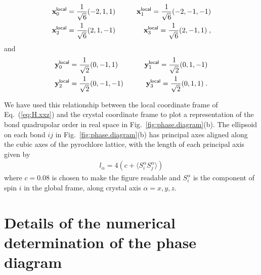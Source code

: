 \documentclass[apsrev4-1,prx,superscriptaddress,floatfix,twocolumn,longbibliography]{revtex4-1}
\begin{document}
\begin{appendix}
\begin{eqnarray}
&\mathbf{x}^{\sf local}_0 = \dfrac{1}{\sqrt{6}}(-2,1,1)
\qquad
&\mathbf{x}^{\sf local}_1 = \dfrac{1}{\sqrt{6}}(-2,-1,-1)
\nonumber \\
&\mathbf{x}^{\sf local}_2 = \dfrac{1}{\sqrt{6}}(2,1,-1)
\qquad
&\mathbf{x}^{\sf local}_3 = \dfrac{1}{\sqrt{6}}(2,-1,1)
\; , \nonumber
\label{eq:local-easy-plane-x}\\
\end{eqnarray}
%
and
\begin{eqnarray}
&\mathbf{y}^{\sf local}_0 = \dfrac{1}{\sqrt{2}}(0,-1,1)
\qquad
&\mathbf{y}^{\sf local}_1 = \dfrac{1}{\sqrt{2}}(0,1,-1)
\nonumber \\
&\mathbf{y}^{\sf local}_2 = \dfrac{1}{\sqrt{2}}(0,-1,-1)
\qquad
&\mathbf{y}^{\sf local}_3 = \dfrac{1}{\sqrt{2}}(0,1,1)
\; . \nonumber
\label{eq:local-easy-plane-y}\\
\end{eqnarray}


We have used this relationship between the local
coordinate frame of Eq.~(\ref{eq:H.xxz}) and the crystal coordinate
frame to plot a representation of the bond quadrupolar
order in real space in Fig.~\ref{fig:phase.diagram}(b).
%
The ellipsoid on each bond $ij$ in Fig.~\ref{fig:phase.diagram}(b)
has principal axes aligned along the cubic axes of the pyrochlore
lattice, with the length of each principal axis given by
%
\begin{eqnarray}
l_{\alpha}=4(c+\langle S^{\alpha}_i S^{\alpha}_j \rangle)
\end{eqnarray}
%
where $c=0.08$ is chosen to make the figure readable 
and $S^{\alpha}_i$ is the component of spin $i$ in the
global frame, along crystal axis $\alpha=x,y,z$.

\section{Details of the numerical determination of the phase diagram}
\label{app:phasediagram}



\end{appendix}
\end{document}
